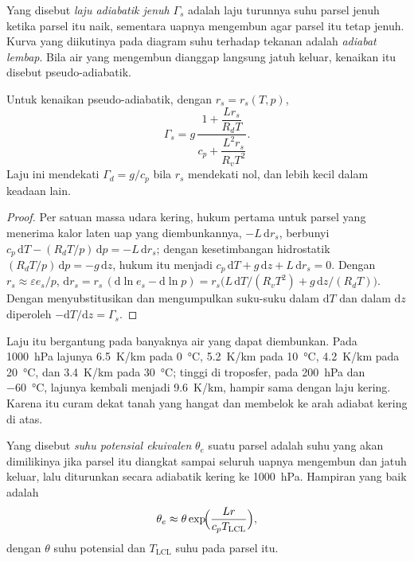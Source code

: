 \begin{definition}\label{def:b2:atmospheric-thermodynamics:moist-adiabat}
Yang disebut \emph{laju adiabatik jenuh} $\Gamma_s$ adalah
laju turunnya suhu parsel jenuh ketika parsel itu naik, sementara uapnya mengembun
agar parsel itu tetap jenuh. Kurva yang diikutinya pada diagram suhu terhadap tekanan adalah
\emph{adiabat lembap}. Bila air yang mengembun dianggap langsung jatuh
keluar, kenaikan itu disebut pseudo-adiabatik.
\end{definition}

\begin{proposition}\label{prop:b2:atmospheric-thermodynamics:gamma-s}
Untuk kenaikan pseudo-adiabatik, dengan $r_s = r_s(T, p)$,
\[
  \Gamma_s = g\,\frac{1 + \dfrac{L r_s}{R_d T}}{c_p + \dfrac{L^2 r_s}{R_v T^2}} .
\]
Laju ini mendekati $\Gamma_d = g/c_p$ bila $r_s$ mendekati nol, dan lebih kecil dalam keadaan lain.
\end{proposition}

\begin{proof}
Per satuan massa udara kering, hukum pertama untuk parsel yang menerima kalor laten uap
yang diembunkannya, $-L\,\mathrm{d}r_s$, berbunyi $c_p\,\mathrm{d}T - (R_dT/p)\,\mathrm{d}p = -L\,
\mathrm{d}r_s$; dengan kesetimbangan hidrostatik $(R_dT/p)\,\mathrm{d}p = -g\,\mathrm{d}z$, hukum itu menjadi
$c_p\,\mathrm{d}T + g\,\mathrm{d}z + L\,\mathrm{d}r_s = 0$. Dengan $r_s \approx \varepsilon e_s/p$,
$\mathrm{d}r_s = r_s\,(\mathrm{d}\ln e_s - \mathrm{d}\ln p) = r_s\bigl(L\,\mathrm{d}T/(R_vT^2) +
g\,\mathrm{d}z/(R_dT)\bigr)$. Dengan menyubstitusikan dan mengumpulkan suku-suku dalam $\mathrm{d}T$ dan dalam
$\mathrm{d}z$ diperoleh $-\mathrm{d}T/\mathrm{d}z = \Gamma_s$.
\end{proof}

Laju itu bergantung pada banyaknya air yang dapat diembunkan. Pada \qty{1000}{hPa} lajunya
\qty{6.5}{K/km} pada \qty{0}{\celsius}, \qty{5.2}{K/km} pada \qty{10}{\celsius}, \qty{4.2}{K/km} pada
\qty{20}{\celsius}, dan \qty{3.4}{K/km} pada \qty{30}{\celsius}; tinggi di troposfer, pada
\qty{200}{hPa} dan \qty{-60}{\celsius}, lajunya kembali menjadi \qty{9.6}{K/km}, hampir sama dengan laju kering. Karena itu
 curam dekat tanah yang hangat dan membelok ke arah adiabat kering di atas.

\begin{definition}\label{def:b2:atmospheric-thermodynamics:theta-e}
Yang disebut \emph{suhu potensial ekuivalen} $\theta_e$
suatu parsel adalah suhu yang akan dimilikinya jika parsel itu diangkat sampai seluruh uapnya mengembun
dan jatuh keluar, lalu diturunkan secara adiabatik kering ke \qty{1000}{hPa}. Hampiran yang baik adalah
\[
  \theta_e \approx \theta \exp\!\Bigl(\frac{L r}{c_p T_{\text{LCL}}}\Bigr),
\]
dengan $\theta$ suhu potensial dan $T_{\text{LCL}}$ suhu pada  parsel itu.
\end{definition}

